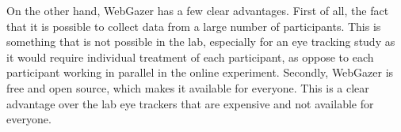 On the other hand, WebGazer has a few clear advantages. First of all, the fact that it is possible to collect data from a large number of participants. This is something that is not possible in the lab, especially for an eye tracking study as it would require individual treatment of each participant, as oppose to each participant working in parallel in the online experiment. Secondly, WebGazer is free and open source, which makes it available for everyone. This is a clear advantage over the lab eye trackers that are expensive and not available for everyone. 